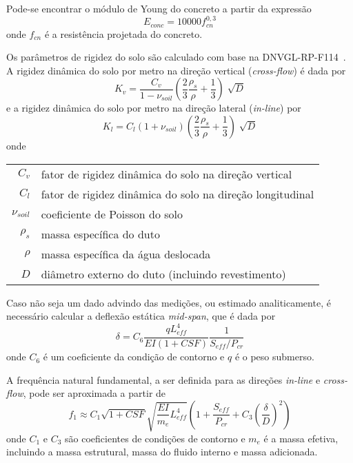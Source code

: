 Pode-se encontrar o módulo de Young do concreto a partir da expressão
\begin{equation}
\label{eq:jdsn-Econc}
E_\mathit{conc} = 10000 f_\mathit{cn}^{0,3}
\end{equation}
onde $f_\mathit{cn}$ é a resistência projetada do concreto.

Os parâmetros de rigidez do solo são calculado com base na DNVGL-RP-F114~\cite{DNVF114}.
A rigidez dinâmica do solo por metro na direção vertical (\textit{cross-flow}) é dada por
\begin{equation}
\label{eq:jdsn-Kv}
K_v = \frac{C_v}{1 - \nu_\mathit{soil}}\left(\frac{2}{3}\frac{\rho_s}{\rho}+\frac{1}{3}\right)\sqrt[]{D}
\end{equation}
e a rigidez dinâmica do solo por metro na direção lateral (\textit{in-line}) por
\begin{equation}
\label{eq:jdsn-Kl}
K_l = C_l (1+\nu_\mathit{soil})\left(\frac{2}{3}\frac{\rho_s}{\rho}+ \frac{1}{3}\right)\sqrt[]{D}
\end{equation}
onde

\begin{tabular}{rl}
	$C_v$               & fator de rigidez dinâmica do solo na direção vertical\\
	$C_l$               & fator de rigidez dinâmica do solo na direção longitudinal\\
	$\nu_\mathit{soil}$ & coeficiente de Poisson do solo\\
	$\rho_s$            & massa específica do duto\\
	$\rho$              & massa específica da água deslocada\\
	$D$                 & diâmetro externo do duto (incluindo revestimento)
\end{tabular}

Caso não seja um dado advindo das medições, ou estimado analiticamente, é necessário calcular a deflexão estática \textit{mid-span}, que é dada por
\begin{equation}
\label{eq:jdsn-deflex}
\delta = C_6 \frac{q L_\mathit{eff}^4}{\mathit{EI} (1 + \mathit{CSF})} \frac{1}{S_\mathit{eff}/P_\mathit{cr}}
\end{equation}
onde $C_6$ é um coeficiente da condição de contorno e $q$ é o peso submerso.

A frequência natural fundamental, a ser definida para as direções \textit{in-line} e \textit{cross-flow}, pode ser aproximada a partir de
\begin{equation}
\label{eq:jdsn-f1}
f_1 \approx C_1 \sqrt{1 + \mathit{CSF}}\sqrt{\frac{\mathit{EI}}{m_e} L_\mathit{eff}^4} \left(1 + \frac{S_\mathit{eff}}{P_\mathit{cr}} + C_3 \left(\frac{\delta}{D}\right)^2\right)
\end{equation}
onde $C_1$ e $C_3$ são coeficientes de condições de contorno e $m_e$ é a massa efetiva, incluindo a massa estrutural, massa do fluido interno e massa adicionada.

